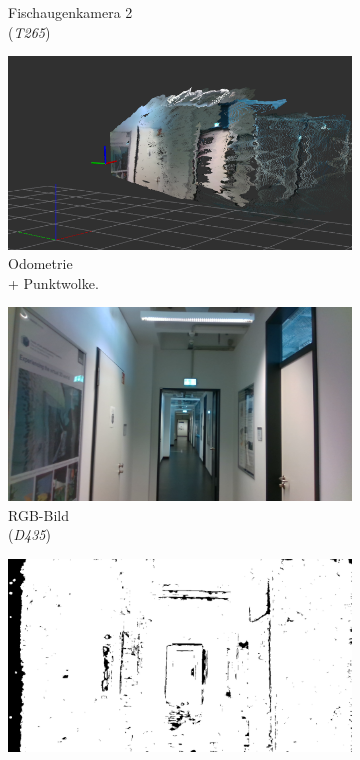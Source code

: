 \begin{figure}[h!]
\begin{subfigure}[b]{0.31\linewidth}
		\caption{Fischaugenkamera 2 \\(\textit{T265})}
	\end{subfigure}
	\medskip
	\begin{subfigure}[b]{0.31\linewidth}
	\includegraphics[width=\linewidth]{images/dataset/pointcloud1.png}
	\caption{Odometrie \\ + Punktwolke.}
	\end{subfigure}
	\hfill
	\begin{subfigure}[b]{0.31\linewidth}
		\includegraphics[width=\linewidth]{images/dataset/dc_frame000005.png}
		\caption{RGB-Bild \\ (\textit{D435})}
	\end{subfigure}
	\hfill
	\begin{subfigure}[b]{0.31\linewidth}
		\includegraphics[width=\linewidth]{images/dataset/dt_frame000005.png}

\end{subfigure}
\end{figure}
